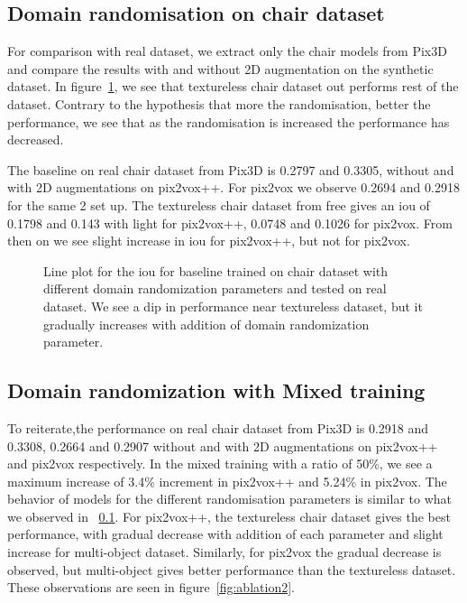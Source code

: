 \subsection{Domain randomisation on chair dataset}\label{subsec:domain-randomisation-on-chair-dataset}
For comparison with real dataset, we extract only the chair models from Pix3D and compare the results  with and without 2D augmentation on the synthetic dataset.
In figure~\ref{fig:ablation1}, we see that textureless chair dataset out performs rest of the dataset.
Contrary to the hypothesis that more the randomisation, better the performance, we see that as the randomisation is increased the performance has decreased.

The baseline on real chair dataset from Pix3D is 0.2797 and 0.3305, without and with 2D augmentations on pix2vox++.
For pix2vox we observe 0.2694 and 0.2918 for the same 2 set up.
The textureless chair dataset from \gls{free} gives an \gls{iou} of 0.1798 and 0.143 with light for pix2vox++, 0.0748 and 0.1026 for pix2vox.
From then on we see slight increase in \gls{iou} for pix2vox++, but not for pix2vox.

\begin{figure}
    \centering
    \resizebox{0.7\textwidth}{!}{}
    \caption{Line plot for the \gls{iou}  for baseline trained on chair dataset with different domain randomization parameters and tested on real dataset.
    We see a dip in performance near textureless dataset, but it gradually increases with addition of domain randomization parameter.}
    \label{fig:ablation1}
\end{figure}

\subsection{Domain randomization with Mixed training}\label{subsec:domain-randomisation-with-mixed-training}

To reiterate,the performance on real chair dataset from Pix3D is 0.2918 and 0.3308, 0.2664 and 0.2907 without and with 2D augmentations on pix2vox++ and pix2vox respectively.
In the mixed training with a ratio of 50\%, we see a maximum increase of 3.4\% increment in pix2vox++ and 5.24\% in pix2vox.
The behavior of models for the different randomisation parameters is similar to what we observed in ~\ref{subsec:domain-randomisation-on-chair-dataset}.
For pix2vox++, the textureless chair dataset gives the best performance, with gradual decrease with addition of each parameter and slight increase for multi-object dataset.
Similarly, for pix2vox the gradual decrease is observed, but multi-object gives better performance than the textureless dataset.
These observations are seen in figure~\ref{fig:ablation2}.

